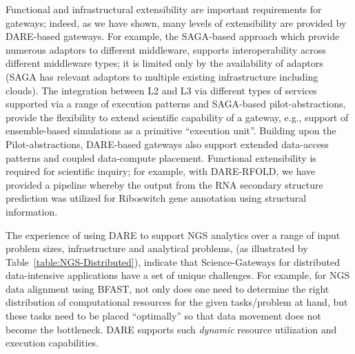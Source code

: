 \documentclass[]{svjour3}
\begin{document}



Functional and infrastructural extensibility are important
requirements for gateways; indeed, as we have shown, many levels of
extensibility are provided by DARE-based gateways.  For example, the
SAGA-based approach which provide numerous adaptors to different
middleware, supports interoperability across different middleware
types; it is limited only by the availability of adaptors (SAGA has
relevant adaptors to multiple existing infrastructure including
clouds).  The integration between L2 and L3 via different types of
services supported via a range of execution patterns and SAGA-based
pilot-abstractions, provide the flexibility to extend scientific
capability of a gateway, e.g., support of ensemble-based simulations
as a primitive ``execution unit''.  Building upon the
Pilot-abstractions, DARE-based gateways also support extended
data-access patterns and coupled data-compute placement.  Functional
extensibility is required for scientific inquiry; for example, with
DARE-RFOLD, we have provided a pipeline whereby the output from the
RNA secondary structure prediction was utilized for Riboswitch gene
annotation using structural information.




The experience of using DARE to support NGS analytics over a range of
input problem sizes, infrastructure and analytical problems, (as
illustrated by Table~\ref{table:NGS-Distributed}), indicate that
Science-Gateways for distributed data-intensive applications have a
set of unique challenges. For example, for NGS data alignment using
BFAST, not only does one need to determine the right distribution of
computational resources for the given tasks/problem at hand, but these
tasks need to be placed ``optimally'' so that data movement does not
become the bottleneck. DARE supports such {\it dynamic} resource
utilization and execution capabilities.
\end{document}
